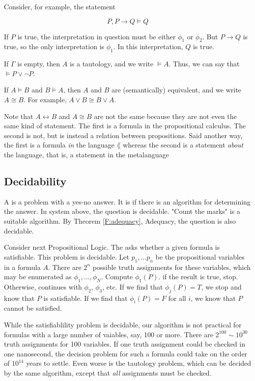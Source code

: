 Consider, for example, the statement

$$
P, P \to Q \models Q
$$

If $P$ is true, the interpretation in question must be either $\phi_1$ or
$\phi_2$. But $P \to Q$ is true, so the only interpretation is $\phi_1$.  In this interpretation, $Q$ is true. 


If $\Gamma$ is empty, then $A$ is a tautology, and we write $\models A$.   Thus, we can say that $\models P \lor \neg P$.

 
If $A \models B$ and $B \models A$, then $A$ and $B$  are (semantically) equivalent, and we write $A \cong B$.  For example, $A \lor B \cong B \lor A$.

Note that $A \leftrightarrow B$ and $A \cong B$ are not the same because they are not even the same kind of statement.  The first is a formula in the propositional calculus.  The second is not, but is instead a relation between propositions.  Said another way, the first is a formula \emph{in} the language $\lang$ whereas the second is a statement \emph{about} the language, that is, a statement in the metalanguage


\subsection{Decidability}



A  is a problem with a yes-no answer.  It is  if there is an algorithm for determining the answer.  In system  above, the question  is decidable.  "Count the marks" is  a suitable algorithm.  By Theorem \ref{F:adequacy}, Adequacy, the question  is also decidable.


Consider next Propositional Logic.  The  asks whether a given formula is satisfiable.  This problem is decidable.  Let $p_1, \ldots p_n$ be the propositional variables in a formula $A$.  There are $2^n$ possible truth assignments for these variables, which may be enumerated as $\phi_1, \ldots, \phi_N$.  Compute $\phi_1(P)$.  if the result is true, stop.  Otherwise, continues with $\phi_2$, $\phi_3$, etc. If we find that $\phi_j(P) = T$, we stop and know that $P$ is satisfiable.  If we find that $\phi_i(P) = F$ for all $i$, we know that $P$ cannot be satisfied.

While the satisfiablility problem is decidable, our algorithm is not practical for formulas with a large number of vaiables, say, 100 or more.  There are 
$2^{100} \sim 10^{30}$ truth assignments for 100 variables.  If one truth assignment could be checked in one nanosecond, the decision problem for such a formula could take on the order of $10^{14}$  years to settle.  Even worse is the tautology problem, which can be decided by the same algorithm, except that \emph{all} assignments must be checked.  

